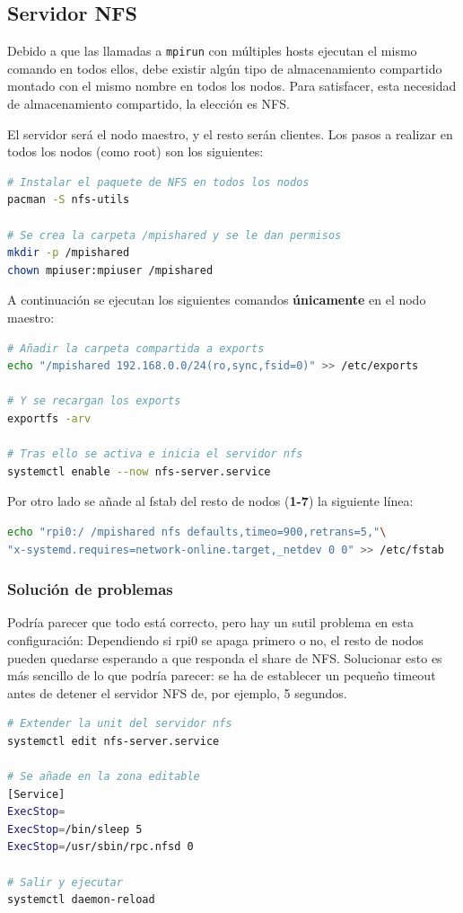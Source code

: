 \subsection{Servidor NFS}
Debido a que las llamadas a \texttt{mpirun} con múltiples hosts ejecutan el mismo comando en todos ellos, debe existir algún tipo de almacenamiento compartido montado con el mismo nombre en todos los nodos. Para satisfacer, esta necesidad de almacenamiento compartido, la elección es NFS.

El servidor será el nodo maestro, y el resto serán clientes. Los pasos a realizar en todos los nodos (como root) son los siguientes:

\begin{lstlisting}[language=bash]
# Instalar el paquete de NFS en todos los nodos
pacman -S nfs-utils

# Se crea la carpeta /mpishared y se le dan permisos
mkdir -p /mpishared
chown mpiuser:mpiuser /mpishared
\end{lstlisting}

A continuación se ejecutan los siguientes comandos \textbf{únicamente} en el nodo maestro:

\begin{lstlisting}[language=bash]
# Añadir la carpeta compartida a exports
echo "/mpishared 192.168.0.0/24(ro,sync,fsid=0)" >> /etc/exports

# Y se recargan los exports
exportfs -arv

# Tras ello se activa e inicia el servidor nfs
systemctl enable --now nfs-server.service
\end{lstlisting}

Por otro lado se añade al fstab del resto de nodos (\textbf{1-7}) la siguiente línea:
\begin{lstlisting}[language=bash]
echo "rpi0:/ /mpishared nfs defaults,timeo=900,retrans=5,"\
"x-systemd.requires=network-online.target,_netdev 0 0" >> /etc/fstab
\end{lstlisting}

\subsubsection{Solución de problemas}
Podría parecer que todo está correcto, pero hay un sutil problema en esta configuración: Dependiendo si rpi0 se apaga primero o no, el resto de nodos pueden quedarse esperando a que responda el share de NFS. Solucionar esto es más sencillo de lo que podría parecer: se ha de establecer un pequeño timeout antes de detener el servidor NFS de, por ejemplo, 5 segundos.

\begin{lstlisting}[language=bash]
# Extender la unit del servidor nfs
systemctl edit nfs-server.service

# Se añade en la zona editable
[Service]
ExecStop=
ExecStop=/bin/sleep 5
ExecStop=/usr/sbin/rpc.nfsd 0

# Salir y ejecutar
systemctl daemon-reload
\end{lstlisting}